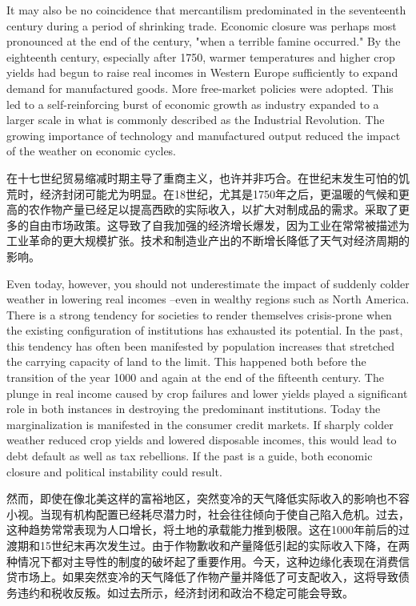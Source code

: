 \begin{Parallel}{97mm}{45mm}
  \ParallelLText
  {It may also be no coincidence that mercantilism predominated in the seventeenth century during a period of shrinking trade. Economic closure was perhaps most pronounced at the end of the century, "when a terrible famine occurred." By the eighteenth century, especially after 1750, warmer temperatures and higher crop yields had begun to raise real incomes in Western Europe sufficiently to expand demand for manufactured goods. More free-market policies were adopted. This led to a self-reinforcing burst of economic growth as industry expanded to a larger scale in what is commonly described as the Industrial Revolution. The growing importance of technology and manufactured output reduced the impact of the weather on economic cycles.}
  
  \ParallelRText
  {在十七世纪贸易缩减时期主导了重商主义，也许并非巧合。在世纪末发生可怕的饥荒时，经济封闭可能尤为明显。在18世纪，尤其是1750年之后，更温暖的气候和更高的农作物产量已经足以提高西欧的实际收入，以扩大对制成品的需求。采取了更多的自由市场政策。这导致了自我加强的经济增长爆发，因为工业在常常被描述为工业革命的更大规模扩张。技术和制造业产出的不断增长降低了天气对经济周期的影响。}
  \ParallelPar


  \ParallelLText
  {Even today, however, you should not underestimate the impact of suddenly colder weather in lowering real incomes --even in wealthy regions such as North America. There is a strong tendency for societies to render themselves crisis-prone when the existing configuration of institutions has exhausted its potential. In the past, this tendency has often been manifested by population increases that stretched the carrying capacity of land to the limit. This happened both before the transition of the year 1000 and again at the end of the fifteenth century. The plunge in real income caused by crop failures and lower yields played a significant role in both instances in destroying the predominant institutions. Today the marginalization is manifested in the consumer credit markets. If sharply colder weather reduced crop yields and lowered disposable incomes, this would lead to debt default as well as tax rebellions. If the past is a guide, both economic closure and political instability could result.}
  
  \ParallelRText
  {然而，即使在像北美这样的富裕地区，突然变冷的天气降低实际收入的影响也不容小视。当现有机构配置已经耗尽潜力时，社会往往倾向于使自己陷入危机。过去，这种趋势常常表现为人口增长，将土地的承载能力推到极限。这在1000年前后的过渡期和15世纪末再次发生过。由于作物歉收和产量降低引起的实际收入下降，在两种情况下都对主导性的制度的破坏起了重要作用。今天，这种边缘化表现在消费信贷市场上。如果突然变冷的天气降低了作物产量并降低了可支配收入，这将导致债务违约和税收反叛。如过去所示，经济封闭和政治不稳定可能会导致。}
  \ParallelPar



\end{Parallel}
